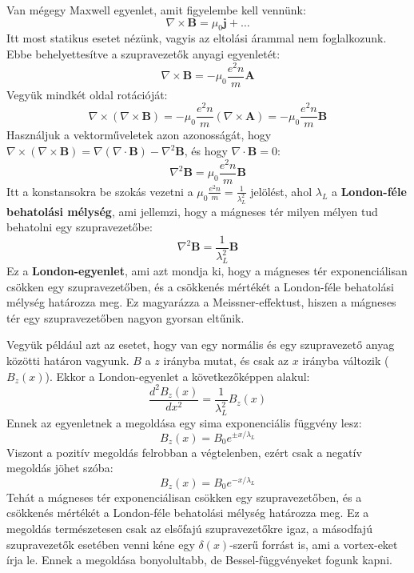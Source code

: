 \documentclass[../main.tex]{subfiles}
\begin{document}
Van mégegy Maxwell egyenlet, amit figyelembe kell vennünk:
\begin{equation}
    \nabla \times \mathbf{B} = \mu_0 \mathbf{j} + \dots
\end{equation}
Itt most statikus esetet nézünk, vagyis az eltolási árammal nem foglalkozunk. Ebbe behelyettesítve a szupravezetők anyagi egyenletét:
\begin{equation}
    \nabla \times \mathbf{B} = - \mu_0 \frac{e^2 n}{m} \mathbf{A}
\end{equation}
Vegyük mindkét oldal rotációját:
\begin{equation}
    \nabla \times (\nabla \times \mathbf{B}) = - \mu_0 \frac{e^2 n}{m} (\nabla \times \mathbf{A}) = - \mu_0 \frac{e^2 n}{m} \mathbf{B}
\end{equation}
Használjuk a vektorműveletek azon azonosságát, hogy $\nabla \times (\nabla \times \mathbf{B}) = \nabla (\nabla \cdot \mathbf{B}) - \nabla^2 \mathbf{B}$, és hogy $\nabla \cdot \mathbf{B} = 0$:
\begin{equation}
    \nabla^2 \mathbf{B} = \mu_0 \frac{e^2 n}{m} \mathbf{B}
\end{equation}
Itt a konstansokra be szokás vezetni a $\mu_0 \frac{e^2 n}{m} = \frac{1}{\lambda_L^2}$ jelölést, ahol $\lambda_L$ a \textbf{London-féle behatolási mélység}, ami jellemzi, hogy a mágneses tér milyen mélyen tud behatolni egy szupravezetőbe:
\begin{equation}
    \boxed{\nabla^2 \mathbf{B} = \frac{1}{\lambda_L^2} \mathbf{B}}
\end{equation}
Ez a \textbf{London-egyenlet}, ami azt mondja ki, hogy a mágneses tér exponenciálisan csökken egy szupravezetőben, és a csökkenés mértékét a London-féle behatolási mélység határozza meg. Ez magyarázza a Meissner-effektust, hiszen a mágneses tér egy szupravezetőben nagyon gyorsan eltűnik.

Vegyük például azt az esetet, hogy van egy normális és egy szupravezető anyag közötti határon vagyunk. $B$ a $z$ irányba mutat, és csak az $x$ irányba változik ($B_z (x)$). Ekkor a London-egyenlet a következőképpen alakul:
\begin{equation}
    \frac{d^2 B_z (x)}{dx^2} = \frac{1}{\lambda_L^2} B_z (x)
\end{equation}
Ennek az egyenletnek a megoldása egy sima exponenciális függvény lesz:
\begin{equation}
    B_z (x) = B_0 e^{\pm x / \lambda_L}
\end{equation}
Viszont a pozitív megoldás felrobban a végtelenben, ezért csak a negatív megoldás jöhet szóba:
\begin{equation}
    B_z (x) = B_0 e^{- x / \lambda_L}
\end{equation}
Tehát a mágneses tér exponenciálisan csökken egy szupravezetőben, és a csökkenés mértékét a London-féle behatolási mélység határozza meg. Ez a megoldás természetesen csak az elsőfajú szupravezetőkre igaz, a másodfajú szupravezetők esetében venni kéne egy $\delta(x)$-szerű forrást is, ami a vortex-eket írja le.
Ennek a megoldása bonyolultabb, de Bessel-függvényeket fogunk kapni.
\end{document}
